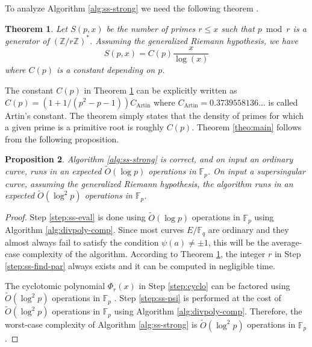 \documentclass[12pt]{article}
\theoremstyle{plain}
\newtheorem{theorem}{Theorem}
\newtheorem{proposition}[theorem]{Proposition}
\theoremstyle{definition}
\newcommand{\tildO}{\tilde{O}}
\def\Z{\ensuremath{\mathbb{Z}}}
\def\F{\ensuremath{\mathbb{F}}}
\begin{document}
To analyze Algorithm \ref{alg:ss-strong} we need the following theorem \cite{hooley1967artin, 
matthews1976generalisation, finch2003mathematical}.
\begin{theorem}
	\label{theo:Artin}
	Let $S(p, x)$ be the number of primes $r \le x$ such that $p \bmod r$ is a generator of 
	$(\Z/r\Z)^*$. Assuming the generalized Riemann hypothesis, we have 
	\[ S(p, x) = C(p)\frac{x}{\log(x)}\]
	where $C(p)$ is a constant depending on $p$.
\end{theorem}
The constant $C(p)$ in Theorem \ref{theo:Artin} can be explicitly written as $C(p) = (1 + 1 / (p^2 
- p - 1))C_{\text{Artin}}$ where $C_{\text{Artin}} = 0.3739558136\dots$ is called Artin's 
constant. The theorem simply states that the density of primes for which a given prime is a 
primitive root is roughly $C(p)$. Theorem \ref{theo:main} follows from the following proposition.
\begin{proposition}
	\label{prop:ss-strong}
	Algorithm \ref{alg:ss-strong} is correct, and on input an ordinary curve, runs in an expected 
	$\tildO(\log p)$ operations in $\F_p$. On input a supersingular curve, assuming the generalized 
	Riemann hypothesis, the algorithm runs in an expected $\tildO(\log^2 p)$ operations in $\F_p$.
\end{proposition}
\begin{proof}
	Step \ref{step:ss-eval} is done using $\tildO(\log p)$ operations in $\F_p$ using Algorithm 
	\ref{alg:divpoly-comp}. Since most curves $E/\F_q$ are ordinary and they almost always fail to 
	satisfy the condition $\psi(a) \ne \pm 1$, this will be the average-case complexity of the 
	algorithm. According to Theorem \ref{theo:Artin}, the integer $r$ in Step  
	\ref{step:ss-find-par} always exists and it can be computed in negligible time. 
	
	The cyclotomic polynomial $\Phi_r(x)$ in Step \ref{step:cyclo} can be factored using 
	$\tildO(\log^2p)$ operations in $\F_p$ \cite{shoup1994}. Step \ref{step:ss-psi} is performed at 
	the cost of $\tildO(\log^2p)$ operations in $\F_p$ using Algorithm \ref{alg:divpoly-comp}. 
	Therefore, the worst-case complexity of Algorithm \ref{alg:ss-strong} is $\tildO(\log^2 p)$ 
	operations in $\F_p$.
\end{proof}
\end{document}
